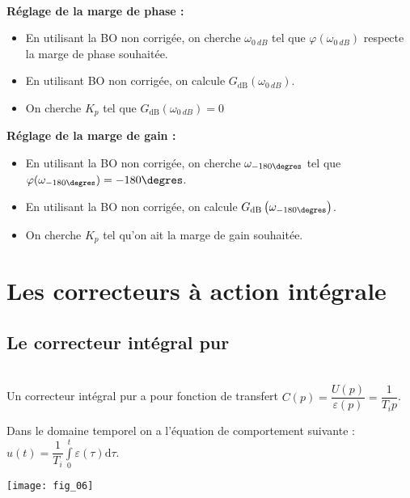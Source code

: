\begin{methode} ~\\
\vspace{-1cm}
\begin{multicols}{2}
\textbf{Réglage de la marge de phase :}
\begin{itemize}
\item En utilisant la BO non corrigée, on cherche $\omega_{\SI{0}{dB}}$ tel que $\varphi(\omega_{\SI{0}{dB}})$ respecte la marge de phase souhaitée. 
\item En utilisant BO non corrigée, on calcule $G_{\text{dB}}\left(\omega_{\SI{0}{dB}}\right)$. 
\item On cherche $K_p$ tel que $G_{\text{dB}}\left(\omega_{\SI{0}{dB}}\right)=0$
\end{itemize}
\vspace{.25cm}

\vfill

\textbf{Réglage de la marge de gain :}
\begin{itemize}
\item En utilisant la BO non corrigée, on cherche $\omega_{-180\degres}$ tel que $\varphi(\omega_{-180\degres})=-180\degres$.
\item En utilisant la BO non corrigée, on calcule $G_{\text{dB}}\left(\omega_{-180\degres}\right)$. 
\item On cherche $K_p$ tel qu'on ait la marge de gain souhaitée.
\end{itemize}
\end{multicols}
\end{methode}

\newpage

\section{Les correcteurs à action intégrale}
\subsection{Le correcteur intégral pur}

\noindent\begin{minipage}[c]{.49\linewidth}
\begin{defi}  ~\\

Un correcteur intégral pur a pour fonction de transfert $C(p)=\dfrac{U(p)}{\varepsilon(p)}=\dfrac{1}{T_i p}$.

Dans le domaine temporel on a l'équation de comportement suivante : $u(t)=\dfrac{1}{T_i}\int\limits_0^t \varepsilon (\tau)\text{d}\tau$.
\end{defi}

\end{minipage} \hfill
\begin{minipage}[c]{.49\linewidth}
\begin{center}
\texttt{[image: fig\_06]}
\end{center}
\end{minipage}

